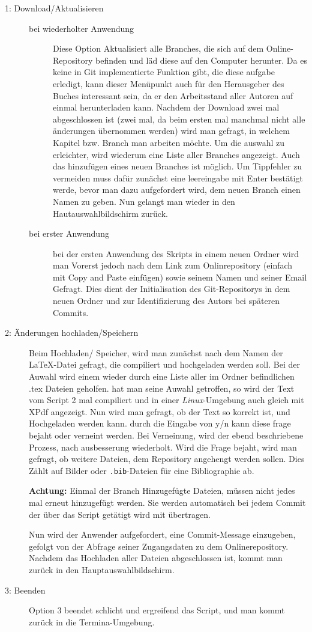 \documentclass[12pt,a4paper]{scrartcl}
\begin{document}
\begin{description}
\item[1: Download/Aktualisieren]
\begin{description}
\item[bei wiederholter Anwendung]
Diese Option Aktualisiert alle Branches, die sich auf dem Online-Repository befinden und läd diese auf den Computer herunter. Da es keine in Git implementierte Funktion gibt, die diese aufgabe erledigt, kann dieser Menüpunkt auch für den Herausgeber des Buches interessant sein, da er den Arbeitsstand aller Autoren auf einmal herunterladen kann. Nachdem der Download zwei mal abgeschlossen ist (zwei mal, da beim ersten mal manchmal nicht alle änderungen übernommen werden) wird man gefragt, in welchem Kapitel bzw. Branch man arbeiten möchte. Um die auswahl zu erleichter, wird wiederum eine Liste aller Branches angezeigt. Auch das hinzufügen eines neuen Branches ist möglich. Um Tippfehler zu vermeiden muss dafür zunächst eine leereingabe mit Enter bestätigt werde, bevor man dazu aufgefordert wird, dem neuen Branch einen Namen zu geben. Nun gelangt man wieder in den Hautauswahlbildschirm zurück.

\item[bei erster Anwendung]
bei der ersten Anwendung des Skripts in einem neuen Ordner wird man Vorerst jedoch nach dem Link zum Onlinrepository (einfach mit Copy and Paste einfügen) sowie seinem Namen und seiner Email Gefragt. Dies dient der Initialisation des Git-Repositorys in dem neuen Ordner und zur Identifizierung des Autors bei späteren Commits.
\end{description}
\item[2: Änderungen hochladen/Speichern]
Beim Hochladen/ Speicher, wird man zunächst nach dem Namen der \LaTeX -Datei gefragt, die compiliert und hochgeladen werden soll. Bei der Auwahl wird einem wieder durch eine Liste aller im Ordner befindlichen .tex Dateien geholfen. hat man seine Auwahl getroffen, so wird der Text vom Script 2 mal compiliert und in einer \emph{Linux}-Umgebung auch gleich mit XPdf angezeigt. Nun wird man gefragt, ob der Text so korrekt ist, und Hochgeladen werden kann. durch die Eingabe von y/n kann diese frage bejaht oder verneint werden. Bei Verneinung, wird der ebend beschriebene Prozess, nach ausbesserung wiederholt. Wird die Frage bejaht, wird man gefragt, ob weitere Dateien, dem Repository angehengt werden sollen. Dies Zählt auf Bilder oder \verb+.bib+-Dateien für eine Bibliographie ab.

\textbf{Achtung:} Einmal der Branch Hinzugefügte Dateien, müssen nicht jedes mal erneut hinzugefügt werden. Sie werden automatisch bei jedem Commit der über das Script getätigt wird mit übertragen.

Nun wird der Anwender aufgefordert, eine Commit-Message einzugeben, gefolgt von der Abfrage seiner Zugangsdaten zu dem Onlinerepository. Nachdem das Hochladen aller Dateien abgeschlossen ist, kommt man zurück in den Hauptauswahlbildschirm.

\item[3: Beenden]
Option 3 beendet schlicht und ergreifend das Script, und man kommt zurück in die Termina-Umgebung.
\end{description}
\end{document}
